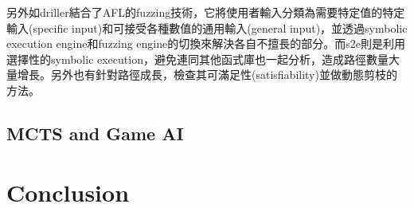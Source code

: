 \documentclass[12pt,a4paper,oneside]{book}
\begin{document}
另外如driller\cite{stephens2016driller}結合了AFL\cite{AFL}的fuzzing技術，它將使用者輸入分類為需要特定值的特定輸入(specific input)和可接受各種數值的通用輸入(general input)，並透過symbolic execution engine和fuzzing engine的切換來解決各自不擅長的部分。而s2e\cite{chipounov2012s2e}則是利用選擇性的symbolic execution，避免連同其他函式庫也一起分析，造成路徑數量大量增長。另外也有針對路徑成長，檢查其可滿足性(satisfiability)並做動態剪枝的方法\cite{PathPruning}。

\section{MCTS and Game AI}


\chapter{Conclusion}

\newpage

\printbibliography[title={References}]
\end{document}
